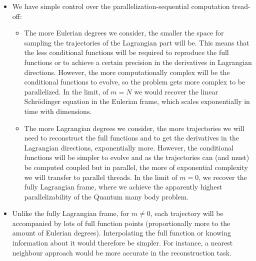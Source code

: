 \documentclass[11pt, a4paper]{article} %
\begin{document}
\begin{itemize}
\item We have simple control over the parallelization-sequential computation tread-off:

\begin{itemize}
\item The more Eulerian degrees we consider, the smaller the space for sampling the trajectories of the Lagrangian part will be. This means that the less conditional functions will be required to reproduce the full functions or to achieve a certain precision in the derivatives in Lagrangian directions. However, the more computationally complex will be the conditional functions to evolve, so the problem gets more complex to be parallelized. In the limit, of $m=N$ we would recover the linear Schrödinger equation in the Eulerian frame, which scales exponentially in time with dimensions.

\item The more Lagrangian degrees we consider, the more trajectories we will need to reconstruct the full functions and to get the derivatives in the Lagrangian directions, exponentially more. However, the conditional functions will be simpler to evolve and as the trajectories can (and must) be computed coupled but in parallel, the more of exponential complexity we will transfer to parallel threads. In the limit of $m=0$, we recover the fully Lagrangian frame, where we achieve the apparently highest parallelizability of the Quantum many body problem.
\end{itemize} 



\item Unlike the fully Lagrangian frame, for $m\neq 0$, each trajectory will be accompanied by lots of full function points (proportionally more to the amount of Eulerian degrees). Interpolating the full function or knowing information about it would therefore be simpler. For instance, a nearest neighbour approach would be more accurate in the reconstruction task.


\end{itemize}
\end{document}
